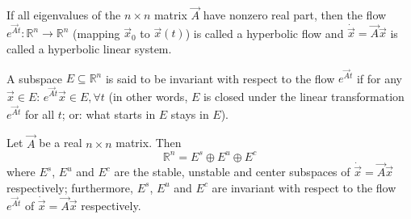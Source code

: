 \begin{definition}
	If all eigenvalues of the $n \times n$ matrix $\vec A$ have nonzero real part, then the flow $e^{\vec A t}: \mathbb R^n \to \mathbb R^n$ (mapping $\vec x_0$ to $\vec x(t)$) is called a hyperbolic flow and $\dot{\vec x} = \vec A \vec x$ is called a hyperbolic linear system.
\end{definition}

\begin{definition}
	A subspace $E \subseteq \mathbb R^n$ is said to be invariant with respect to the flow $e^{\vec At}$ if for any $\vec x \in E$: $e^{\vec At}\vec x \in E, \forall t$ (in other words, $E$ is closed under the linear transformation $e^{\vec At}$ for all $t$; or: what starts in $E$ stays in $E$).
\end{definition}

\begin{theorem}
	Let $\vec A$ be a real $n \times n$ matrix. Then
	\begin{equation*}
		\mathbb R^n = E^s \oplus E^u \oplus E^c
	\end{equation*}
	where $E^s$, $E^u$ and $E^c$ are the stable, unstable and center subspaces of $\dot{\vec x} = \vec A \vec x$ respectively; furthermore, $E^s$, $E^u$ and $E^c$ are invariant with respect to the flow $e^{\vec At}$ of $\dot{\vec x} = \vec A \vec x$ respectively.
\end{theorem}

